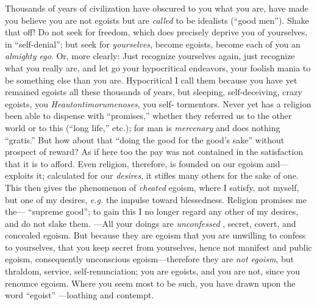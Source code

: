 Thousands of years of civilization have obscured to you what you are, have 
made you believe you are not egoists but are \textit{called} to be idealists 
(``good men''). Shake that off! Do not seek for freedom, which does 
precisely deprive you of yourselves, in ``self-denial''; but seek for 
\textit{yourselves}, become egoists, become each of you an \textit{almighty 
ego}. Or, more clearly: Just recognize yourselves again, just recognize what 
you really are, and let go your hypocritical endeavors, your foolish mania to 
be something else than you are. Hypocritical I call them because you have yet 
remained egoists all these thousands of years, but sleeping, self-deceiving, 
crazy egoists, you \textit{Heautontimorumenoses}, you self- tormentors. Never 
yet has a religion been able to dispense with ``promises,'' whether they 
referred us to the other world or to this (``long life,'' etc.); for man is 
\textit{mercenary} and does nothing ``gratis.'' But how about that ``doing 
the good for the good's sake'' without prospect of reward? As if here too the 
pay was not contained in the satisfaction that it is to afford. Even religion, 
therefore, is founded on our egoism and---exploits it; calculated for our 
\textit{desires}, it stifles many others for the sake of one. This then gives 
the phenomenon of \textit{cheated} egoism, where I satisfy, not myself, but 
one of my desires, \textit{e.g.} the impulse toward blessedness. Religion 
promises me the--- ``supreme good''; to gain this I no longer regard any 
other of my desires, and do not slake them. ---All your doings are 
\textit{unconfessed} , secret, covert, and concealed egoism. But because they 
are egoism that you are unwilling to confess to yourselves, that you keep 
secret from yourselves, hence not manifest and public egoism, consequently 
unconscious egoism---therefore they are \textit{not egoism}, but thraldom, 
service, self-renunciation; you are egoists, and you are not, since you 
renounce egoism. Where you seem most to be such, you have drawn upon the word 
``egoist'' ---loathing and contempt.

